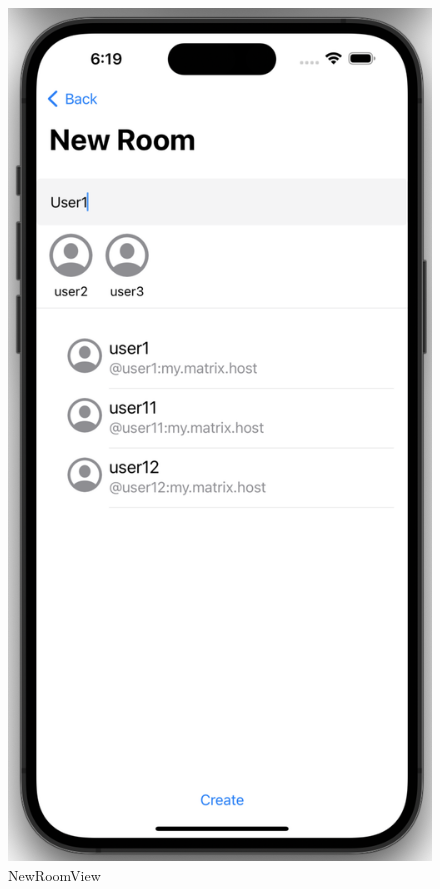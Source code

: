     \begin{figure}[h]
        \includegraphics[scale=0.5]{newroom}
        \centering
        \caption{NewRoomView}\label{fig:newroomview}
    \end{figure}

